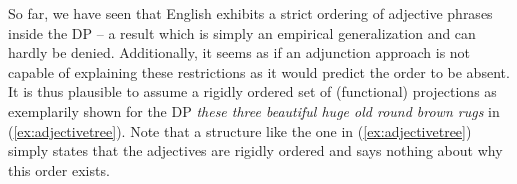 So far, we have seen that English exhibits a strict ordering of adjective phrases inside the DP -- a result which is simply an empirical generalization and can hardly be denied. Additionally, it seems as if an adjunction approach is not capable of explaining these restrictions as it would predict the order to be absent. It is thus plausible to assume a rigidly ordered set of (functional) projections as exemplarily shown for the DP \textit{these three beautiful huge old round brown rugs} in (\ref{ex:adjectivetree}). Note that a structure like the one in (\ref{ex:adjectivetree}) simply states that the adjectives are rigidly ordered and says nothing about why this order exists. 




\begin{exe}
\ex \label{ex:adjectivetree}
\begin{adjustbox}{max width=0.9\textwidth}
\end{adjustbox}
\end{exe}

